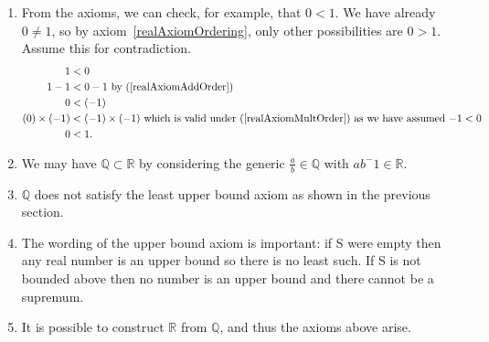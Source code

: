\documentclass[../Main.tex]{subfiles}
\begin{document}
\begin{enumerate}
    \item From the axioms, we can check, for example, that $0<1$. We have already $0 \neq 1$, so by axiom~\ref{realAxiomOrdering}, only other possibilities are $0>1$. Assume this for contradiction.
    \begin{align*}
        1 &< 0 \\
        1-1 &< 0-1 \text{ by (\ref{realAxiomAddOrder})}\\
        0 &< (-1) \\
        (0) \times (-1) &< (-1) \times (-1) \text{ which is valid under (\ref{realAxiomMultOrder}) as we have assumed $-1 < 0$} \\
        0 &< 1.
    \end{align*} \contradiction
    \item We may have $\mathbb{Q} \subset \mathbb{R}$ by considering the generic $\frac{a}{b} \in \mathbb{Q}$ with $ab^-1 \in \mathbb{R}$.
    \item  $\mathbb{Q}$ does not satisfy the least upper bound axiom as shown in the previous section.
    \item The wording of the upper bound axiom is important: if S were empty then any real number is an upper bound so there is no least such. If S is not bounded above then no number is an upper bound and there cannot be a supremum.
    \item It is possible to construct $\mathbb{R}$ from $\mathbb{Q}$, and thus the axioms above arise.
\end{enumerate}
\end{document}
